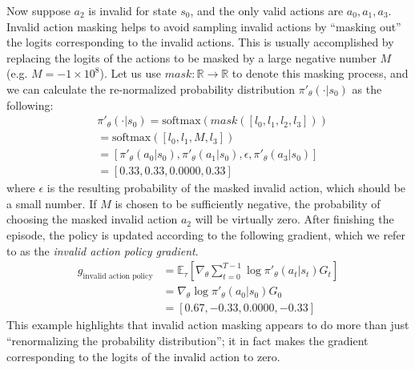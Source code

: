 \documentclass[letterpaper]{article}
\begin{document}
Now suppose $a_2$ is invalid for state $s_0$, and the only valid actions are $a_0, a_1, a_3$. Invalid action masking helps to avoid sampling invalid actions by ``masking out'' the logits corresponding to the invalid actions. This is usually accomplished by replacing the logits of the actions to be masked by a large negative number $M$ (e.g. $M = -1 \times 10^8$).  %
Let us use $mask: \mathbb{R} \rightarrow \mathbb{R}$ to denote this masking process, and we can calculate the re-normalized probability distribution $\pi'_{\theta}(\cdot \vert s_0)$ as the following:
\begin{align}
    &\pi'_{\theta}(\cdot \vert s_0)= \text{softmax}(mask([l_0, l_1, l_2, l_3])) \label{eq:softmax_masked_logits}\\
    &=\text{softmax}([l_0, l_1, M, l_3]) \\
    &= [\pi'_{\theta}(a_0|s_0), \pi'_{\theta}(a_1|s_0), \epsilon, \pi'_{\theta}(a_3|s_0)] \label{eq:softmax_masked_logits2}\\
    &= [0.33, 0.33, 0.0000, 0.33] \nonumber
\end{align}
where $\epsilon$ is the resulting probability of the masked invalid action, which should be a small number. If $M$ is chosen to be sufficiently negative, the probability of choosing the masked invalid action $a_2$ will be virtually zero. After finishing the episode, the policy is updated according to the following gradient, which we refer to as the \emph{invalid action policy gradient}.
\begin{align}
\label{eq:invalid_action_masking_gradient}
    g_{\text{invalid action policy}} &= \mathbb{E}_{\tau}\left [\nabla_{\theta} \sum_{t=0}^{T-1} \log\pi'_{\theta}(a_t|s_t)G_t \right] \\
    &=\nabla_{\theta}\log\pi'_{\theta}(a_0|s_0)G_0  \\
    & = [ 0.67, -0.33,  0.0000, -0.33]\nonumber
\end{align}
This example highlights that invalid action masking appears to do more than just ``renormalizing the probability distribution''; it in fact makes the gradient corresponding to the logits of the invalid action to zero.
\end{document}
